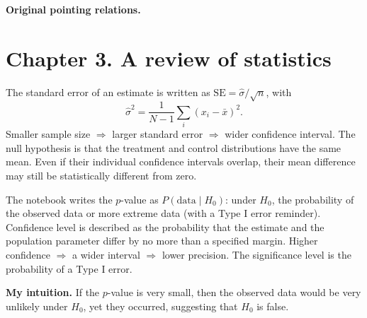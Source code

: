 {\par{}\smallskip\textbf{Original pointing relations.}\par\smallskip
{}
\section{Chapter 3. A review of statistics}
The standard error of an estimate is written as $\mathrm{SE}=\hat\sigma/\sqrt n$, with
\[\hat\sigma^2=\frac{1}{N-1}\sum_i(x_i-\bar x)^2.\]
Smaller sample size $\Rightarrow$ larger standard error $\Rightarrow$ wider confidence interval. The null hypothesis is that the treatment and control distributions have the same mean. Even if their individual confidence intervals overlap, their mean difference may still be statistically different from zero. 

The notebook writes the $p$-value as $P(\text{data}\mid H_0)$: under $H_0$, the probability of the observed data or more extreme data (with a Type I error reminder). Confidence level is described as the probability that the estimate and the population parameter differ by no more than a specified margin. Higher confidence $\Rightarrow$ a wider interval $\Rightarrow$ lower precision. The significance level is the probability of a Type I error.

\textbf{My intuition.} If the $p$-value is very small, then the observed data would be very unlikely under $H_0$, yet they occurred, suggesting that $H_0$ is false. 

}
